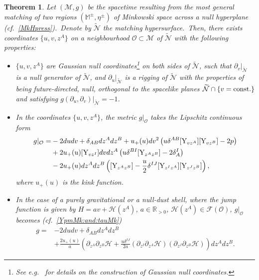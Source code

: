 \documentclass[11pt]{article}
\numberwithin{equation}{section}
\newtheorem{theorem}{Theorem}[section]
\def\Mkpm{\mathbb{M}^{\pm}}
\def\flatpm{\eta^{\pm}}
\def\Fcal{\mathcal F}
\def\Y{\textup{Y}}
\newcommand{\nn}{\nonumber}
\newcommand\N{\mathcal N}
\newcommand\M{\mathcal M}
\def\Fcal{\mathcal F}
\def\Y{\textup{Y}}
\newcommand{\cp}{\partial}
\newcommand{\lp}{\left(}
\newcommand{\rp}{\right)}
\newcommand{\nullhyp}{\widetilde{\N}}
\begin{document}
\begin{theorem}\label{theorem:C0metric:Mk} 
Let $\lp\mathcal{M},g\rp$ be the spacetime resulting from the most general matching of two regions $\lp\Mkpm,\flatpm\rp$ of Minkowski space across a null hyperplane (cf.\ \eqref{MkHpress}).\ Denote by $\nullhyp$ the matching hypersurface.\ 
Then, there exists coordinates $\{u,v,z^A\}$ on a neighbourhood $\mathcal{O}\subset\M$ of $\nullhyp$ with the following properties:
\begin{itemize}\itemsep0cm
	\item[(i)] $\{u,v,z^A\}$ are Gaussian null coordinates\footnote{See e.g.\ \cite{kunduri2013classification, moncrief1983symmetries} 
	for details on the construction of Gaussian null coordinates.} 
	on both sides of $\nullhyp$, such that 	$\cp_{v}\vert_{\nullhyp}$ is a 
	null generator of $\nullhyp$, and 	$\partial_u\vert_{\nullhyp}$
	is a rigging of $\nullhyp$ with the properties of being future-directed, null, orthogonal to 
		the spacelike planes $\nullhyp \cap \{v = \textup{const.}\}$ and satisfying
		$g (\partial_u, \partial_{v} )\vert_{\nullhyp} = -1$.
		\item[(ii)] In the coordinates $\{u,v,z^A\}$, the metric $g\vert_{\mathcal{O}}$ takes the Lipschitz continuous form 
		\begin{align}
			\nonumber g\vert_{\mathcal{O}}=&-2dudv +\delta_{AB}dz^Adz^B+u_+( u)dv^2\lp u\delta^{AB}[\Y_{vz^A}][\Y_{vz^B}]-2p\rp\\
			\nonumber  &+2u_+( u)[\Y_{vz^I}]dvdz^A\lp u\delta^{BI}[\Y_{z^Az^B}]-2\delta^I_A\rp\\
			\label{c0metricprevious}&-2u_+( u)dz^Adz^B\lp [\Y_{z^Az^B}]-\frac{u}{2}\delta^{IJ}[\Y_{z^Iz^A}][\Y_{z^Jz^B}]\rp,
		\end{align}
		where $u_+\lp u\rp$ is the kink function.
\item[$(iii)$]
	In the case of a purely gravitational or a null-dust shell, where 
	the jump function is given by $H=a v+\mathcal{H}(z^A)$, $a\in\mathbb{R}_{>0}$, $\mathcal{H}(z^A)\in\Fcal(\mathcal{O})$,   
	$g\vert_{\mathcal{O}}$ becomes (cf.\ \eqref{YpmMk:and:tauMk}) 
	\begin{align}
		\nn g=&-2dudv +\delta_{AB}dz^Adz^B\\
		\label{c0metricGW}&+\frac{2u_+( u)}{a}\lp \cp_{z^A}\cp_{z^B}\mathcal{H}
		+\frac{u\delta^{IJ}}{2a}(\cp_{z^I}\cp_{z^A}\mathcal{H})(\cp_{z^J}\cp_{z^B}\mathcal{H})\rp dz^Adz^B.
	\end{align}
	\end{itemize}
\end{theorem}
\end{document}
